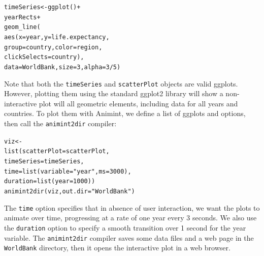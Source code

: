 \documentclass[10pt,journal,compsoc]{IEEEtran}\usepackage[]{graphicx}\usepackage[]{color}
\makeatletter
\newcommand{\hlnum}[1]{\textcolor[rgb]{0,0,0}{#1}}%
\newcommand{\hlstr}[1]{\textcolor[rgb]{0.502,0,0}{#1}}%
\newcommand{\hlopt}[1]{\textcolor[rgb]{0,0,0}{#1}}%
\newcommand{\hlstd}[1]{\textcolor[rgb]{0,0,0}{#1}}%
\newcommand{\hlkwb}[1]{\textcolor[rgb]{0,0,0}{#1}}%
\newcommand{\hlkwc}[1]{\textcolor[rgb]{0,0,1}{#1}}%
\newcommand{\hlkwd}[1]{\textcolor[rgb]{0,0,0}{#1}}%
\newenvironment{kframe}{%
 \def\at@end@of@kframe{}%
 \ifinner\ifhmode%
  \def\at@end@of@kframe{\end{minipage}}%
  \begin{minipage}{\columnwidth}%
 \fi\fi%
 \def\FrameCommand##1{\hskip\@totalleftmargin \hskip-\fboxsep
 \colorbox{shadecolor}{##1}\hskip-\fboxsep
     \hskip-\linewidth \hskip-\@totalleftmargin \hskip\columnwidth}%
 \MakeFramed {\advance\hsize-\width
   \@totalleftmargin\z@ \linewidth\hsize
   \@setminipage}}%
 {\par\unskip\endMakeFramed%
 \at@end@of@kframe}
\newenvironment{knitrout}{}{} %
\makeatother
\begin{document}
\begin{knitrout}
\color{fgcolor}\begin{kframe}
\begin{alltt}
\hlstd{timeSeries} \hlkwb{<-} \hlkwd{ggplot}\hlstd{()}\hlopt{+}
  \hlstd{yearRects}\hlopt{+}
  \hlkwd{geom_line}\hlstd{(}
    \hlkwd{aes}\hlstd{(}\hlkwc{x}\hlstd{=year,} \hlkwc{y}\hlstd{=life.expectancy,}
        \hlkwc{group}\hlstd{=country,} \hlkwc{color}\hlstd{=region,}
        \hlkwc{clickSelects}\hlstd{=country),}
    \hlkwc{data}\hlstd{=WorldBank,} \hlkwc{size}\hlstd{=}\hlnum{3}\hlstd{,} \hlkwc{alpha}\hlstd{=}\hlnum{3}\hlopt{/}\hlnum{5}\hlstd{)}
\end{alltt}
\end{kframe}
\end{knitrout}

Note that both the \texttt{timeSeries} and \texttt{scatterPlot}
objects are valid ggplots. However, plotting them using the standard
ggplot2 library will show a non-interactive plot will all
geometric elements, including data for all years and countries. To
plot them with Animint, we define a list of ggplots and options, then
call the \texttt{animint2dir} compiler:

\begin{knitrout}
\color{fgcolor}\begin{kframe}
\begin{alltt}
\hlstd{viz} \hlkwb{<-}
  \hlkwd{list}\hlstd{(}\hlkwc{scatterPlot}\hlstd{=scatterPlot,}
       \hlkwc{timeSeries}\hlstd{=timeSeries,}
       \hlkwc{time}\hlstd{=}\hlkwd{list}\hlstd{(}\hlkwc{variable}\hlstd{=}\hlstr{"year"}\hlstd{,} \hlkwc{ms}\hlstd{=}\hlnum{3000}\hlstd{),}
       \hlkwc{duration}\hlstd{=}\hlkwd{list}\hlstd{(}\hlkwc{year}\hlstd{=}\hlnum{1000}\hlstd{))}
\hlkwd{animint2dir}\hlstd{(viz,} \hlkwc{out.dir}\hlstd{=}\hlstr{"WorldBank"}\hlstd{)}
\end{alltt}
\end{kframe}
\end{knitrout}

The \texttt{time} option specifies that in absence of user
interaction, we want the plots to animate over time, progressing at a
rate of one year every 3 seconds. We also use the \texttt{duration}
option to specify a smooth transition over 1 second for the year
variable. The \texttt{animint2dir} compiler saves some data files and a
web page in the \texttt{WorldBank} directory, then it opens the
interactive plot in a web browser.
\end{document}
